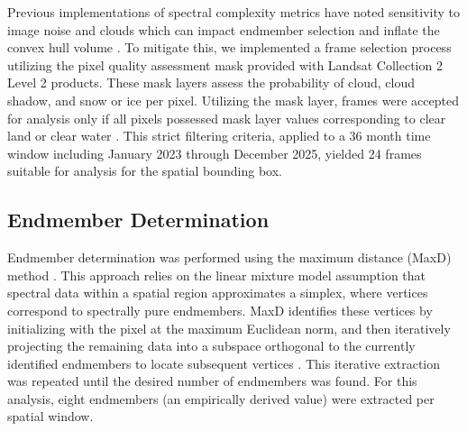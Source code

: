 \documentclass[conference,a4paper]{IEEEtran}
\begin{document}
Previous implementations of spectral complexity metrics have noted sensitivity to image noise and clouds which can impact endmember selection and inflate the convex hull volume \cite{messinger_metrics_2012}. To mitigate this, we implemented a frame selection process utilizing the pixel quality assessment mask provided with Landsat Collection 2 Level 2 products. These mask layers assess the probability of cloud, cloud shadow, and snow or ice per pixel. Utilizing the mask layer, frames were accepted for analysis only if all pixels possessed mask layer values corresponding to clear land  or clear water \cite{earth_resources_observation_and_science_eros_center_landsat_2022}.  This strict filtering criteria, applied to a 36 month time window including January 2023 through December 2025, yielded 24 frames suitable for analysis for the spatial bounding box. 

\subsection{Endmember Determination}

Endmember determination was performed using the maximum distance (MaxD) method \cite{schott_subpixel_2003, lee_subpixel_2003}. This approach relies on the linear mixture model assumption that spectral data within a spatial region approximates a simplex, where vertices correspond to spectrally pure endmembers. MaxD identifies these vertices by initializing with the pixel at the maximum Euclidean norm, and then iteratively projecting the remaining data into a subspace orthogonal to the currently identified endmembers to locate subsequent vertices \cite{lee_subpixel_2003}. This iterative extraction was repeated until the desired number of endmembers was found. For this analysis, eight endmembers (an empirically derived value) were extracted per spatial window. 


\end{document}
